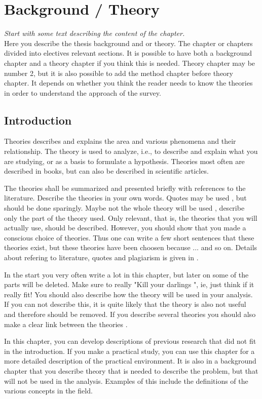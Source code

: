 \chapter{Background / Theory}
\emph{Start with some text describing the content of the chapter.}\\

\noindent Here you describe the thesis background and or theory. The chapter or chapters divided into electives relevant sections. It is possible to have both a background chapter and a theory chapter if you think this is needed. Theory chapter may be number 2, but it is also possible to add the method chapter before theory chapter. It depends on whether you think the reader needs to know the theories in order to understand the approach of the survey.
		
\section{Introduction}
Theories describes and explains the area and various phenomena and their relationship. The theory is used to analyze, i.e., to describe and explain what you are studying, or as a basis to formulate a hypothesis. Theories most often are described in books, but can also be described in scientific articles.

The theories shall be summarized and presented briefly with references to the literature. Describe the theories in your own words. Quotes may be used , but should be done sparingly. Maybe not the whole theory will be used , describe only the part of the theory used. Only relevant, that is, the theories that you will actually use, should be described. However, you should show that you made a conscious choice of theories. Thus one can write a few short sentences that these theories exist, but these theories have been choosen because $\ldots$ and so on. Details about refering to literature, quotes and plagiarism is given in \cite{refero08}.

In the start you very often write a lot in this chapter, but later on some of the parts will be deleted. Make sure to really "Kill your darlings ", ie, just think if it really fit! You should also describe how the theory will be used in your analysis. If you can not describe this, it is quite likely that the theory is also not useful and therefore should be removed. If you describe several theories you should also make a clear link between the theories .

In this chapter, you can develop descriptions of previous research that did not fit in the introduction. If you make a practical study, you can use  this chapter for a more detailed description of the practical environment. It is also in a background chapter that you describe theory that is needed to describe the problem, but that will not be used in the analysis. Examples of this include the definitions of the various concepts in the field.
